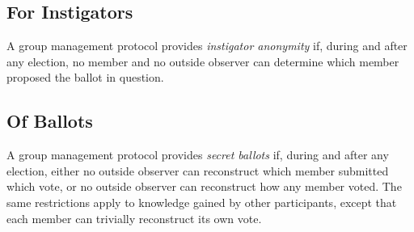   \subsection{For Instigators}
  A group management protocol provides \emph{instigator anonymity} if, during
  and after any election, no member and no outside observer can determine
  which member proposed the ballot in question.

  \subsection{Of Ballots}
  A group management protocol provides \emph{secret ballots} if, during and
  after any election, either no outside observer can reconstruct which member
  submitted which vote, or no outside observer can reconstruct how any
  member voted. The same restrictions apply to knowledge gained by other
  participants, except that each member can trivially reconstruct its own vote.

